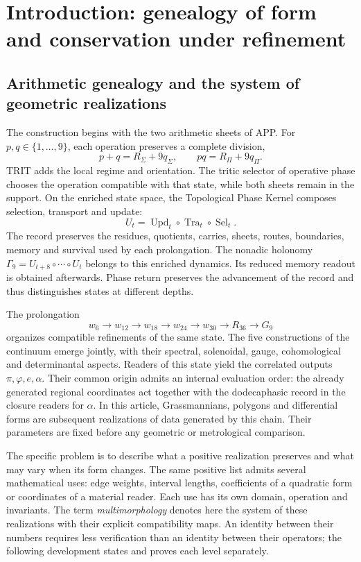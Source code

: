 \documentclass[a4paper,10pt]{article}
\theoremstyle{definition}\newtheorem{definition}[theorem]{Definition}
\theoremstyle{remark}\newtheorem{remark}[theorem]{Remark}
\numberwithin{equation}{section}
\begin{document}
\section{Introduction: genealogy of form and conservation under refinement}
\label{sec:genealogy}

\subsection{Arithmetic genealogy and the system of geometric realizations}
The construction begins with the two arithmetic sheets of APP. For
\(p,q\in\{1,\ldots,9\}\), each operation preserves a complete division,
\[
 p+q=R_\Sigma+9q_\Sigma,\qquad
 pq=R_\Pi+9q_\Pi.
\]
TRIT adds the local regime and orientation. The tritic selector of operative
phase chooses the operation compatible with that state, while both sheets
remain in the support. On the enriched state space, the
Topological Phase Kernel composes selection, transport and update:
\[
 U_t=\operatorname{Upd}_t\circ\operatorname{Tra}_t\circ\operatorname{Sel}_t.
\]
The record preserves the residues, quotients, carries, sheets, routes,
boundaries, memory and survival used by each prolongation. The
nonadic holonomy \(\Gamma_9=U_{t+8}\circ\cdots\circ U_t\) belongs
to this enriched dynamics. Its reduced memory readout is obtained
afterwards. Phase return preserves the advancement of the record and thus
distinguishes states at different depths.

The prolongation
\[
 w_6\longrightarrow w_{12}\longrightarrow w_{18}\longrightarrow
 w_{24}\longrightarrow w_{30}\longrightarrow R_{36}\longrightarrow G_9
\]
organizes compatible refinements of the same state. The five
constructions of the continuum emerge jointly, with their
spectral, solenoidal, gauge, cohomological and determinantal aspects. Readers
of this state yield the correlated outputs \(\pi,\varphi,e,\alpha\).
Their common origin admits an internal evaluation order: the already generated
regional coordinates act together with the dodecaphasic record in the
closure readers for \(\alpha\). In this article, Grassmannians,
polygons and differential forms are subsequent realizations of data
generated by this chain. Their parameters are fixed before any
geometric or metrological comparison.

The specific problem is to describe what a positive realization preserves
and what may vary when its form changes. The same positive list
admits several mathematical uses: edge weights, interval lengths,
coefficients of a quadratic form or coordinates of a material reader.
Each use has its own domain, operation and invariants. The
term \emph{multimorphology} denotes here the system of these realizations
with their explicit compatibility maps. An identity between their numbers
requires less verification than an identity between their operators; the
following development states and proves each level separately.
\end{document}
